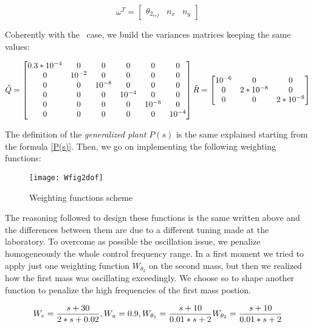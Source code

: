 \begin{equation}
	\omega^{T} =
	\begin{bmatrix}
		\theta_{2_{ref}} & n_x & n_y
	\end{bmatrix}
\end{equation}

Coherently with the \onedof~case, we build the variances matrices keeping the same values:

\begin{equation}
	\tilde{Q}=
	\begin{bmatrix}
		0.3*10^{-4} & 0 & 0 & 0 & 0 & 0\\
		0 & 10^{-2} & 0 & 0 & 0 & 0\\
		0 & 0 & 10^{-8} & 0 & 0 & 0 \\
		0 & 0 & 0 & 10^{-4} & 0 & 0 \\
		0 & 0 & 0 & 0 & 10^{-8} & 0 \\
		0 & 0 & 0 & 0 & 0 & 10^{-4}
	\end{bmatrix}
	\\
	\tilde{R}=
	\begin{bmatrix}
		10^{-6} & 0 & 0\\
		0 & 2*10^{-8} & 0 \\
		0 & 0 & 2*10^{-8} 
	\end{bmatrix}	
\end{equation}

The definition of the \textit{generalized plant} $P(s)$ is the same explained starting from the formula \ref{P(s)}. Then, we go on implementing the following weighting functions:

\begin{figure*}[h]
	\centering
	\texttt{[image: Wfig2dof]}
	\caption{Weighting functions scheme}
	\label{Weighting functions scheme2dof}
\end{figure*}

The reasoning followed to design these functions is the same written above and the differences between them are due to a different tuning made at the laboratory. To overcome as possible the oscillation issue, we penalize homogeneously the whole control frequency range. In a first moment we tried to apply just one weighting function $W_{\theta_{2}}$ on the second mass, but then we realized how the first mass was oscillating exceedingly. We choose so to shape another function to penalize the high frequencies of the first mass postion.

\begin{equation}
	W_e=
	\frac{s+30}{2*s+0.02}
	\\
	,
	\\
	W_u=0.9
	\\
	,
	\\
	W_{\theta_{1}}=
	\frac{s+10}{0.01*s+2}
	\\
	W_{\theta_{2}}=
	\frac{s+10}{0.01*s+2}
\end{equation}

